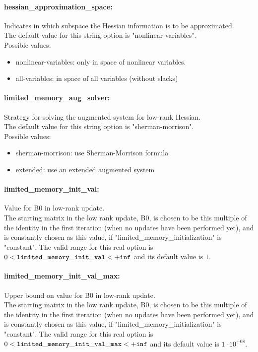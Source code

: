 \paragraph{hessian\_approximation\_space:}\label{sec:hessian_approximation_space} Indicates in which subspace the Hessian information is to be approximated. $\;$ \\

The default value for this string option is "nonlinear-variables".
\\ 
Possible values:
\begin{itemize}
   \item nonlinear-variables: only in space of nonlinear variables.
   \item all-variables: in space of all variables (without slacks)
\end{itemize}

\paragraph{limited\_memory\_aug\_solver:}\label{sec:limited_memory_aug_solver} Strategy for solving the augmented system for low-rank Hessian. $\;$ \\

The default value for this string option is "sherman-morrison".
\\ 
Possible values:
\begin{itemize}
   \item sherman-morrison: use Sherman-Morrison formula
   \item extended: use an extended augmented system
\end{itemize}

\paragraph{limited\_memory\_init\_val:}\label{sec:limited_memory_init_val} Value for B0 in low-rank update. $\;$ \\
 The starting matrix in the low rank update, B0,
is chosen to be this multiple of the identity in
the first iteration (when no updates have been
performed yet), and is constantly chosen as this
value, if "limited\_memory\_initialization" is
"constant". The valid range for this real option is 
$0 <  {\tt limited\_memory\_init\_val } <  {\tt +inf}$
and its default value is $1$.


\paragraph{limited\_memory\_init\_val\_max:}\label{sec:limited_memory_init_val_max} Upper bound on value for B0 in low-rank update. $\;$ \\
 The starting matrix in the low rank update, B0,
is chosen to be this multiple of the identity in
the first iteration (when no updates have been
performed yet), and is constantly chosen as this
value, if "limited\_memory\_initialization" is
"constant". The valid range for this real option is 
$0 <  {\tt limited\_memory\_init\_val\_max } <  {\tt +inf}$
and its default value is $1 \cdot 10^{+08}$.


